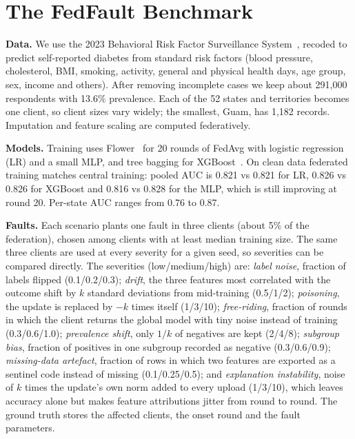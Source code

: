 \documentclass[conference]{IEEEtran}
\begin{document}
\section{The FedFault Benchmark}

\textbf{Data.} We use the 2023 Behavioral Risk Factor Surveillance System~\cite{cdc2023brfss},
recoded to predict self-reported diabetes from standard risk factors (blood pressure, cholesterol,
BMI, smoking, activity, general and physical health days, age group, sex, income and others). After
removing incomplete cases we keep about 291{,}000 respondents with 13.6\% prevalence. Each of the 52
states and territories becomes one client, so client sizes vary widely; the smallest, Guam, has
1{,}182 records. Imputation and feature scaling are computed federatively.

\textbf{Models.} Training uses Flower~\cite{beutel2020flower} for 20 rounds of FedAvg with logistic
regression (LR) and a small MLP, and tree bagging for XGBoost~\cite{chen2016xgboost}. On clean data
federated training matches central training: pooled AUC is 0.821 vs 0.821 for LR, 0.826 vs 0.826 for
XGBoost and 0.816 vs 0.828 for the MLP, which is still improving at round 20. Per-state AUC ranges
from 0.76 to 0.87.

\textbf{Faults.} Each scenario plants one fault in three clients (about 5\% of the federation),
chosen among clients with at least median training size. The same three clients are used at every
severity for a given seed, so severities can be compared directly. The severities (low/medium/high)
are:
\emph{label noise}, fraction of labels flipped (0.1/0.2/0.3);
\emph{drift}, the three features most correlated with the outcome shift by $k$ standard deviations
from mid-training (0.5/1/2);
\emph{poisoning}, the update is replaced by $-k$ times itself (1/3/10);
\emph{free-riding}, fraction of rounds in which the client returns the global model with tiny noise
instead of training (0.3/0.6/1.0);
\emph{prevalence shift}, only $1/k$ of negatives are kept (2/4/8);
\emph{subgroup bias}, fraction of positives in one subgroup recorded as negative (0.3/0.6/0.9);
\emph{missing-data artefact}, fraction of rows in which two features are exported as a sentinel code
instead of missing (0.1/0.25/0.5); and
\emph{explanation instability}, noise of $k$ times the update's own norm added to every upload
(1/3/10), which leaves accuracy alone but makes feature attributions jitter from round to round.
The ground truth stores the affected clients, the onset round and the fault parameters.
\end{document}
